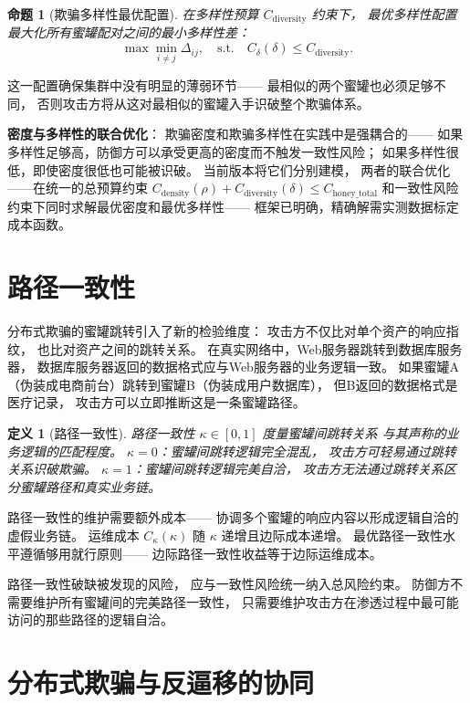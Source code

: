 \documentclass[11pt,a4paper]{article}
\newtheorem{definition}{定义}[section]
\newtheorem{proposition}{命题}[section]
\begin{document}
\begin{proposition}[欺骗多样性最优配置]
在多样性预算 \(C_{\text{diversity}}\) 约束下，
最优多样性配置最大化所有蜜罐配对之间的最小多样性差：
\[
\max \min_{i \neq j} \Delta_{ij},
\quad \text{s.t.} \quad C_{\delta}(\delta) \le C_{\text{diversity}}.
\]
\end{proposition}

这一配置确保集群中没有明显的薄弱环节——
最相似的两个蜜罐也必须足够不同，
否则攻击方将从这对最相似的蜜罐入手识破整个欺骗体系。

\textbf{密度与多样性的联合优化}：
欺骗密度和欺骗多样性在实践中是强耦合的——
如果多样性足够高，防御方可以承受更高的密度而不触发一致性风险；
如果多样性很低，即使密度很低也可能被识破。
当前版本将它们分别建模，
两者的联合优化——在统一的总预算约束
\(C_{\text{density}}(\rho) + C_{\text{diversity}}(\delta) \le C_{\text{honey\_total}}\)
和一致性风险约束下同时求解最优密度和最优多样性——
框架已明确，精确解需实测数据标定成本函数。

\section{路径一致性}

分布式欺骗的蜜罐跳转引入了新的检验维度：
攻击方不仅比对单个资产的响应指纹，
也比对资产之间的跳转关系。
在真实网络中，Web服务器跳转到数据库服务器，
数据库服务器返回的数据格式应与Web服务器的业务逻辑一致。
如果蜜罐A（伪装成电商前台）跳转到蜜罐B（伪装成用户数据库），
但B返回的数据格式是医疗记录，
攻击方可以立即推断这是一条蜜罐路径。

\begin{definition}[路径一致性]
路径一致性 \(\kappa \in [0,1]\) 度量蜜罐间跳转关系
与其声称的业务逻辑的匹配程度。
\(\kappa = 0\)：蜜罐间跳转逻辑完全混乱，
攻击方可轻易通过跳转关系识破欺骗。
\(\kappa = 1\)：蜜罐间跳转逻辑完美自洽，
攻击方无法通过跳转关系区分蜜罐路径和真实业务链。
\end{definition}

路径一致性的维护需要额外成本——
协调多个蜜罐的响应内容以形成逻辑自洽的虚假业务链。
运维成本 \(C_{\kappa}(\kappa)\) 随 \(\kappa\) 递增且边际成本递增。
最优路径一致性水平遵循够用就行原则——
边际路径一致性收益等于边际运维成本。

路径一致性破缺被发现的风险，
应与一致性风险统一纳入总风险约束。
防御方不需要维护所有蜜罐间的完美路径一致性，
只需要维护攻击方在渗透过程中最可能访问的那些路径的逻辑自洽。

\section{分布式欺骗与反逼移的协同}
\end{document}
